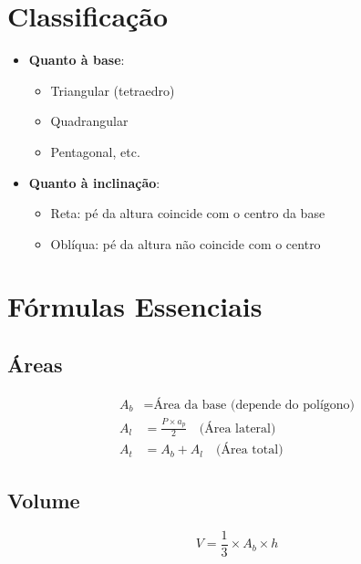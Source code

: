 \documentclass[11pt]{article}
\begin{document}
\begin{multicols}{2}
\section*{Classificação}
\begin{itemize}[leftmargin=*]
    \item \textbf{Quanto à base}:
    \begin{itemize}
        \item Triangular (tetraedro)
        \item Quadrangular
        \item Pentagonal, etc.
    \end{itemize}
    \item \textbf{Quanto à inclinação}:
    \begin{itemize}
        \item Reta: pé da altura coincide com o centro da base
        \item Oblíqua: pé da altura não coincide com o centro
    \end{itemize}
\end{itemize}

\section*{Fórmulas Essenciais}
\subsection*{Áreas}
\[
\begin{aligned}
A_b &= \text{Área da base (depende do polígono)} \\
A_l &= \frac{P \times a_p}{2} \quad \text{(Área lateral)} \\
A_t &= A_b + A_l \quad \text{(Área total)}
\end{aligned}
\]

\subsection*{Volume}
\[
V = \frac{1}{3} \times A_b \times h
\]

\begin{center}
\end{center}


\end{multicols}
\end{document}
